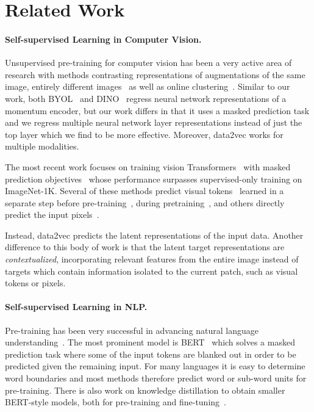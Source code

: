 \documentclass[nohyperref]{article}
\theoremstyle{plain}
\theoremstyle{definition}
\theoremstyle{remark}
\newcommand{\name}{data2vec}
\begin{document}
\section{Related Work}
\label{sec:related}

\paragraph{Self-supervised Learning in Computer Vision.}
Unsupervised pre-training for computer vision has been a very active area of research with methods contrasting representations of augmentations of the same image, entirely different images~\citep{chen2020simple,grill2020byol,caron2021dino,chen2021mocov3} as well as online clustering~\citep{caron2020swav}.
Similar to our work, both BYOL~\citep{grill2020byol} and DINO~\citep{caron2021dino} regress neural network representations of a momentum encoder, but our work differs in that it uses a masked prediction task and we regress multiple neural network layer representations instead of just the top layer which we find to be more effective.
Moreover, \name{} works for multiple modalities.

The most recent work focuses on training vision Transformers~\citep{dosovitskiy2020vit} with masked prediction objectives~\citep{bao2021beit,he2021mae,xie2021simmim} whose performance surpasses supervised-only training on ImageNet-1K.
Several of these methods predict visual tokens~\citep{bao2021beit,he2021mae,dong2022peco} learned in a separate step before pre-training~\citep{oord2017vqvae,ramesh2021zero}, during pretraining~\citep{zhou2021ibot}, and others directly predict the input pixels~\citep{he2021mae,xie2021simmim}.

Instead, \name{} predicts the latent representations of the input data.
Another difference to this body of work is that the latent target representations are \emph{contextualized}, incorporating relevant features from the entire image instead of targets which contain information isolated to the current patch, such as visual tokens or pixels.


\paragraph{Self-supervised Learning in NLP.}
Pre-training has been very successful in advancing natural language understanding~\citep{mccann2017cove,peters2018acl,radford2018unsup,baevski2019bitransformer,devlin2018bert,yang2019xlnet,brown2020gpt3}. 
The most prominent model is BERT~\citep{devlin2018bert} which solves a masked prediction task where some of the input tokens are blanked out in order to be predicted given the remaining input.
For many languages it is easy to determine word boundaries and most methods therefore predict word or sub-word units for pre-training.
There is also work on knowledge distillation to obtain smaller BERT-style models, both for pre-training and fine-tuning~\citep{jiao2020tinybert}.
\end{document}
